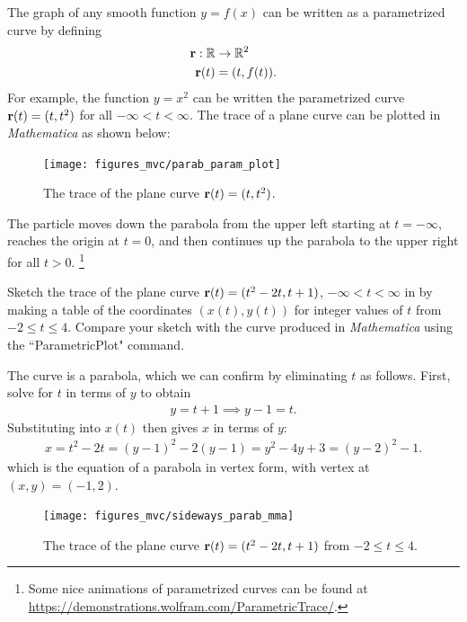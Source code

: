 \documentclass[12pt,letterpaper,reqno]{article}
\numberwithin{equation}{section}
\newcommand{\R}{\ensuremath{\mathbb R}}
\newcommand{\bbr}{{\bf r}}
\begin{document}
{\newpage

\begin{example}
The graph of any smooth function $y=f(x)$ can be written as a parametrized curve by defining
\begin{align*}
	\bbr:\R &\to \R^2 \\
	\bbr(t)&=(t,f(t)).
\end{align*}
For example, the function $y=x^2$ can be written the parametrized curve $\bbr(t)=(t,t^2)$ for all $-\infty < t < \infty$.	The trace of a plane curve can be plotted in \emph{Mathematica} as shown below:

\begin{figure}[h]
	\begin{center}
		\texttt{[image: figures\_mvc/parab\_param\_plot]}
	\end{center}
	\caption{The trace of the plane curve $\bbr(t)=(t,t^2)$.}
\end{figure} 

The particle moves down the parabola from the upper left starting at $t=-\infty$, reaches the origin at $t=0$, and then continues up the parabola to the upper right for all $t>0$. \footnote{Some nice animations of parametrized curves can be found at \href{https://demonstrations.wolfram.com/ParametricTrace/}{https://demonstrations.wolfram.com/ParametricTrace/}.}
\end{example}


\begin{exercise}
Sketch the trace of the plane curve $\bbr(t)=(t^2-2t,t+1)$, $-\infty < t < \infty$ in by making a table of the coordinates $(x(t),y(t))$ for integer values of $t$ from $-2 \leq t \leq 4$. Compare your sketch with the curve produced in \emph{Mathematica} using the ``ParametricPlot" command.	
\end{exercise}
{\color{red}
\begin{solution}
	The curve is a parabola, which we can confirm by eliminating $t$ as follows. First, solve for $t$ in terms of $y$ to obtain
\begin{align*}
	y=t+1 \implies y-1=t.
\end{align*}
Substituting into $x(t)$ then gives $x$ in terms of $y$:
\begin{align*}
	x=t^2-2t=(y-1)^2-2(y-1)=y^2-4y+3=(y-2)^2-1.
\end{align*}
which is the equation of a parabola in vertex form, with vertex at $(x,y)=(-1,2)$. 

\begin{figure}[h]
	\begin{center}
		\texttt{[image: figures\_mvc/sideways\_parab\_mma]}
	\end{center}
	\caption{The trace of the plane curve $\bbr(t)=(t^2-2t,t+1)$ from $-2 \leq t \leq 4$.}
\end{figure}


\end{solution}}}
\end{document}
